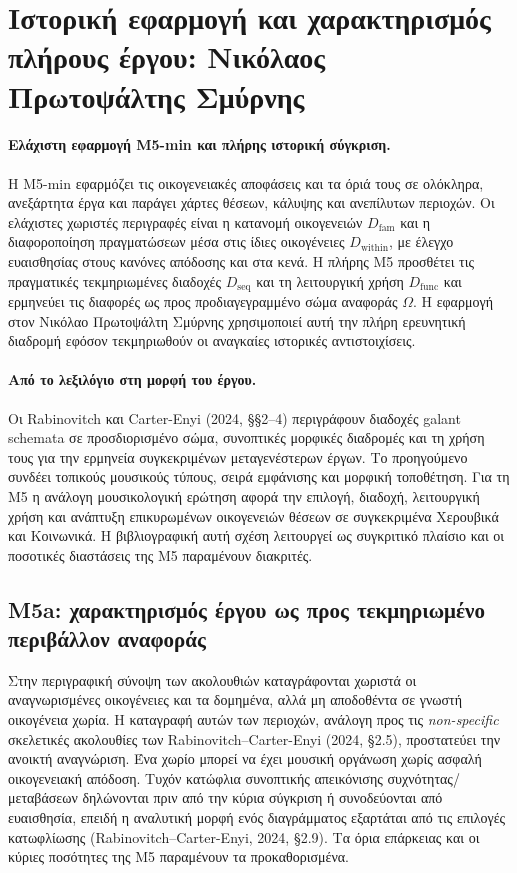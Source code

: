 \documentclass[11pt,a4paper]{article}
\begin{document}
\section{Ιστορική εφαρμογή και χαρακτηρισμός πλήρους έργου: Νικόλαος Πρωτοψάλτης Σμύρνης}\label{sec:nikolaos}

\paragraph{Ελάχιστη εφαρμογή Μ5-min και πλήρης ιστορική σύγκριση.}
Η Μ5-min εφαρμόζει τις οικογενειακές αποφάσεις και τα όριά τους σε ολόκληρα, ανεξάρτητα έργα και παράγει χάρτες θέσεων, κάλυψης και ανεπίλυτων περιοχών. Οι ελάχιστες χωριστές περιγραφές είναι η κατανομή οικογενειών $D_{\mathrm{fam}}$ και η διαφοροποίηση πραγματώσεων μέσα στις ίδιες οικογένειες $D_{\mathrm{within}}$, με έλεγχο ευαισθησίας στους κανόνες απόδοσης και στα κενά. Η πλήρης M5 προσθέτει τις πραγματικές τεκμηριωμένες διαδοχές $D_{\mathrm{seq}}$ και τη λειτουργική χρήση $D_{\mathrm{func}}$ και ερμηνεύει τις διαφορές ως προς προδιαγεγραμμένο σώμα αναφοράς $\Omega$. Η εφαρμογή στον Νικόλαο Πρωτοψάλτη Σμύρνης χρησιμοποιεί αυτή την πλήρη ερευνητική διαδρομή εφόσον τεκμηριωθούν οι αναγκαίες ιστορικές αντιστοιχίσεις.


\paragraph{Από το λεξιλόγιο στη μορφή του έργου.} Οι Rabinovitch και Carter-Enyi (2024, §§2--4) περιγράφουν διαδοχές galant schemata σε προσδιορισμένο σώμα, συνοπτικές μορφικές διαδρομές και τη χρήση τους για την ερμηνεία συγκεκριμένων μεταγενέστερων έργων. Το προηγούμενο συνδέει τοπικούς μουσικούς τύπους, σειρά εμφάνισης και μορφική τοποθέτηση. Για τη M5 η ανάλογη μουσικολογική ερώτηση αφορά την επιλογή, διαδοχή, λειτουργική χρήση και ανάπτυξη επικυρωμένων οικογενειών θέσεων σε συγκεκριμένα Χερουβικά και Κοινωνικά. Η βιβλιογραφική αυτή σχέση λειτουργεί ως συγκριτικό πλαίσιο και οι ποσοτικές διαστάσεις της M5 παραμένουν διακριτές.

\subsection{M5a: χαρακτηρισμός έργου ως προς τεκμηριωμένο περιβάλλον αναφοράς}\label{sec:m5-reference}

Στην περιγραφική σύνοψη των ακολουθιών καταγράφονται χωριστά οι αναγνωρισμένες οικογένειες και τα δομημένα, αλλά μη αποδοθέντα σε γνωστή οικογένεια χωρία. Η καταγραφή αυτών των περιοχών, ανάλογη προς τις \emph{non-specific} σκελετικές ακολουθίες των Rabinovitch--Carter-Enyi (2024, §2.5), προστατεύει την ανοικτή αναγνώριση. Ένα χωρίο μπορεί να έχει μουσική οργάνωση χωρίς ασφαλή οικογενειακή απόδοση. Τυχόν κατώφλια συνοπτικής απεικόνισης συχνότητας/μεταβάσεων δηλώνονται πριν από την κύρια σύγκριση ή συνοδεύονται από ευαισθησία, επειδή η αναλυτική μορφή ενός διαγράμματος εξαρτάται από τις επιλογές κατωφλίωσης (Rabinovitch--Carter-Enyi, 2024, §2.9). Τα όρια επάρκειας και οι κύριες ποσότητες της M5 παραμένουν τα προκαθορισμένα.
\end{document}
